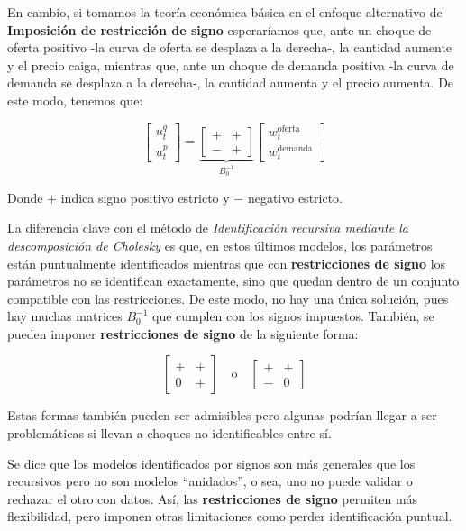 \documentclass[
]{book}
\begin{document}
En cambio, si tomamos la teoría económica básica en el enfoque alternativo de \textbf{Imposición de restricción de signo} esperaríamos que, ante un choque de oferta positivo -la curva de oferta se desplaza a la derecha-, la cantidad aumente y el precio caiga, mientras que, ante un choque de demanda positiva -la curva de demanda se desplaza a la derecha-, la cantidad aumenta y el precio aumenta. De este modo, tenemos que:

\begin{equation}
  \begin{bmatrix} u_t^q \\ u_t^p \end{bmatrix} = 
    \underbrace{
  \begin{bmatrix} + & + \\ - & + \end{bmatrix}
    }_{B_0^{-1}}
  \begin{bmatrix} w_t^{\text{oferta}} \\ w_t^{\text{demanda}} \end{bmatrix}
\end{equation}

Donde \(+\) indica signo positivo estricto y \(-\) negativo estricto.

La diferencia clave con el método de \emph{Identificación recursiva mediante la descomposición de Cholesky} es que, en estos últimos modelos, los parámetros están puntualmente identificados mientras que con \textbf{restricciones de signo} los parámetros no se identifican exactamente, sino que quedan dentro de un conjunto compatible con las restricciones. De este modo, no hay una única solución, pues hay muchas matrices \(B_0^{-1}\) que cumplen con los signos impuestos. También, se pueden imponer \textbf{restricciones de signo} de la siguiente forma:

\begin{equation}
  \begin{bmatrix} + & + \\ 0 & + \end{bmatrix}
      \quad \text{o} \quad 
  \begin{bmatrix} + & + \\ - & 0 \end{bmatrix}
\end{equation}

Estas formas también pueden ser admisibles pero algunas podrían llegar a ser problemáticas si llevan a choques no identificables entre sí.

Se dice que los modelos identificados por signos son más generales que los recursivos pero no son modelos ``anidados'', o sea, uno no puede validar o rechazar el otro con datos. Así, las \textbf{restricciones de signo} permiten más flexibilidad, pero imponen otras limitaciones como perder identificación puntual.
\end{document}
